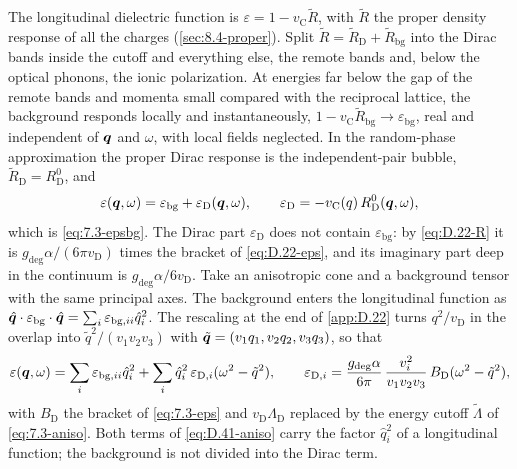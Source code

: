 The longitudinal dielectric function is $\varepsilon = 1 - v_{\mathrm{C}}\tilde R$, with $\tilde R$ the proper density response of all the charges (\cref{sec:8.4-proper}). Split $\tilde R = \tilde R_{\mathrm{D}} + \tilde R_{\mathrm{bg}}$ into the Dirac bands inside the cutoff and everything else, the remote bands and, below the optical phonons, the ionic polarization. At energies far below the gap of the remote bands and momenta small compared with the reciprocal lattice, the background responds locally and instantaneously, $1 - v_{\mathrm{C}}\tilde R_{\mathrm{bg}} \to \varepsilon_{\mathrm{bg}}$, real and independent of $\bm{q}$ and $\omega$, with local fields neglected. In the random-phase approximation the proper Dirac response is the independent-pair bubble, $\tilde R_{\mathrm{D}} = R^0_{\mathrm{D}}$, and
\begin{equation}
  \varepsilon(\bm{q},\omega) = \varepsilon_{\mathrm{bg}} + \varepsilon_{\mathrm{D}}(\bm{q},\omega), \qquad \varepsilon_{\mathrm{D}} = -v_{\mathrm{C}}(q)\,R^0_{\mathrm{D}}(\bm{q},\omega) ,
  \label{eq:D.41-eps}
\end{equation}
which is \cref{eq:7.3-epsbg}. The Dirac part $\varepsilon_{\mathrm{D}}$ does not contain $\varepsilon_{\mathrm{bg}}$: by \cref{eq:D.22-R} it is $g_{\mathrm{deg}}\alpha/(6\pi v_{\mathrm{D}})$ times the bracket of \cref{eq:D.22-eps}, and its imaginary part deep in the continuum is $g_{\mathrm{deg}}\alpha/6v_{\mathrm{D}}$. Take an anisotropic cone and a background tensor with the same principal axes. The background enters the longitudinal function as $\hat{\bm{q}}\cdot\varepsilon_{\mathrm{bg}}\cdot\hat{\bm{q}} = \sum_i\varepsilon_{\mathrm{bg},ii}\hat q_i^2$. The rescaling at the end of \cref{app:D.22} turns $q^2/v_{\mathrm{D}}$ in the overlap into $\tilde q^2/(v_1v_2v_3)$ with $\tilde{\bm{q}} = (v_1q_1, v_2q_2, v_3q_3)$, so that
\begin{equation}
  \varepsilon(\bm{q},\omega) = \sum_i\varepsilon_{\mathrm{bg},ii}\hat q_i^2 + \sum_i\hat q_i^2\,\varepsilon_{\mathrm{D},i}(\omega^2 - \tilde q^2), \qquad
  \varepsilon_{\mathrm{D},i} = \frac{g_{\mathrm{deg}}\alpha}{6\pi}\,\frac{v_i^2}{v_1v_2v_3}\,B_{\mathrm{D}}(\omega^2 - \tilde q^2) ,
  \label{eq:D.41-aniso}
\end{equation}
with $B_{\mathrm{D}}$ the bracket of \cref{eq:7.3-eps} and $v_{\mathrm{D}}\Lambda_{\mathrm{D}}$ replaced by the energy cutoff $\tilde\Lambda$ of \cref{eq:7.3-aniso}. Both terms of \cref{eq:D.41-aniso} carry the factor $\hat q_i^2$ of a longitudinal function; the background is not divided into the Dirac term.

